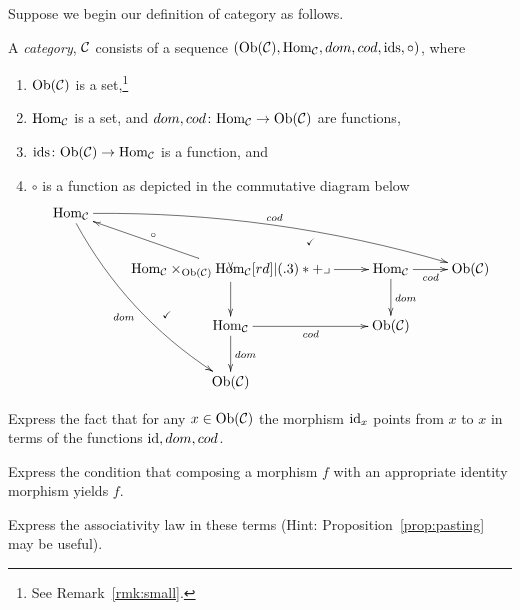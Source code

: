 \documentclass[CT4S-EN-RU]{subfiles}
\begin{document}
\begin{exerciseENG}\label{exc:cat in set}
Suppose we begin our definition of category as follows. 

A {\em category}, $\mathcal{C}$ consists of a sequence $(\textnormal{Ob}(\mathcal{C}),\textnormal{Hom}_\mathcal{C},dom,cod,\textnormal{ids},\circ)$, where 
\begin{enumerate}
\item $\textnormal{Ob}(\mathcal{C})$ is a set,\footnote{See Remark~\ref{rmk:small}.}
\item $\textnormal{Hom}_\mathcal{C}$ is a set, and $dom,cod\colon\textnormal{Hom}_\mathcal{C}\rightarrow\textnormal{Ob}(\mathcal{C})$ are functions, 
\item $\textnormal{ids}\colon\textnormal{Ob}(\mathcal{C})\rightarrow\textnormal{Hom}_\mathcal{C}$ is a function, and 
\item $\circ$ is a function as depicted in the commutative diagram below
\begin{align}\label{dia:pullback version of cat}
\xymatrix{
\Hom_\mcC\ar@/^1pc/[drrr]^{cod}\ar@/_1pc/[dddr]_{dom}&&\\
&\Hom_\mcC\times_{\Ob(\mcC)}\Hom_\mcC\ar@{}[ur]|{\checkmark}\ar@{}[ddl]|(.4){\checkmark}\ar[ul]_\circ\ar[r]\ar[d]\ullimit&\Hom_\mcC\ar[r]_{cod}\ar[d]^{dom}&\Ob(\mcC)\\
&\Hom_\mcC\ar[r]_{cod}\ar[d]^{dom}&\Ob(\mcC)\\
&\Ob(\mcC)
}
\end{align}
\end{enumerate}

\sexc Express the fact that for any $x\in\textnormal{Ob}(\mathcal{C})$ the morphism $\textnormal{id}_x$ points from $x$ to $x$ in terms of the functions $\textnormal{id},dom,cod$. 
\item Express the condition that composing a morphism $f$ with an appropriate identity morphism yields $f$.
\item Express the associativity law in these terms (Hint: Proposition~\ref{prop:pasting} may be useful).
\endsexc
\end{exerciseENG}

\begin{exerciseRUS}\label{exc:cat in set}
\end{exerciseRUS}
\end{document}
